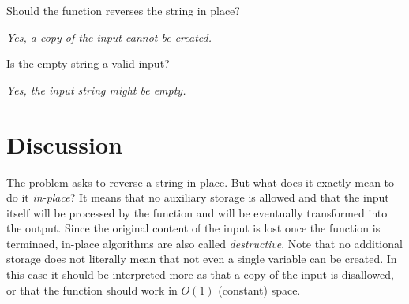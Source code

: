 \begin{QandA}
	\item Should the function reverses the string in place?
	\begin{answered}
		\textit{Yes, a copy of the input cannot be created.}
	\end{answered}

	\item Is the empty string a valid input?
	\begin{answered}
		\textit{Yes, the input string might be empty.}
	\end{answered}
	
\end{QandA}

\section{Discussion}
\label{string_reverse:sec:discussion}
The problem asks to reverse a string in place. But what does it exactly mean to do it \textit{in-place}? It means that no auxiliary storage is allowed and that the input itself will be processed by the function and will be eventually transformed into the output. Since the original content of the input is lost once the function is terminaed, in-place algorithms are also called \textit{destructive}. Note that no additional storage does not literally mean that not even a single variable can be created. In this case it should be interpreted more as that a copy of the input is disallowed, or that the function should work in $O(1)$ (constant) space.

